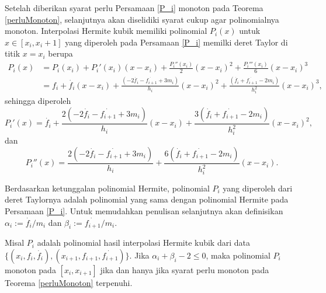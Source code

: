 Setelah diberikan syarat perlu Persamaan \eqref{P_i} monoton pada Teorema \ref{perluMonoton}, selanjutnya akan diselidiki syarat cukup agar polinomialnya monoton. Interpolasi Hermite kubik memiliki polinomial $P_i(x)$ untuk $x \in [x_i,x_i+1]$ yang diperoleh pada Persamaan \eqref{P_i} memilki deret Taylor di titik $x=x_i$ berupa
\begin{equation}\label{taylorHermite}
\begin{split}
    P_i(x) &= P_i(x_i) + P_i'(x_i)(x-x_i) + \frac{P_i''(x_i)}{2}(x-x_i)^2 + \frac{P_i'''(x_i)}{6}(x-x_i)^3 \\
    &= f_i + \dot{f_i}(x-x_i) + \frac{(-2\dot{f_i}-\dot{f_{i+1}}+3m_i)}{h_i}(x-x_i)^2 + \frac{(\dot{f_i}+\dot{f_{i+1}}-2m_i)}{h_i^2}(x-x_i)^3,
\end{split}
\end{equation}
sehingga diperoleh
\begin{equation}\label{taylorHermite2}
    P_i'(x) = \dot{f_i} + \frac{2(-2\dot{f_i}-\dot{f_{i+1}}+3m_i)}{h_i}(x-x_i) + \frac{3(\dot{f_i}+\dot{f_{i+1}}-2m_i)}{h_i^2}(x-x_i)^2,
\end{equation}
dan
\begin{equation}
    P_i''(x) = \frac{2(-2\dot{f_i}-\dot{f_{i+1}}+3m_i)}{h_i} + \frac{6(\dot{f_i}+\dot{f_{i+1}}-2m_i)}{h_i^2}(x-x_i).
\end{equation}

Berdasarkan ketunggalan polinomial Hermite, polinomial $P_i$ yang diperoleh dari deret Taylornya adalah polinomial yang sama dengan polinomial Hermite pada Persamaan \eqref{P_i}. Untuk memudahkan penulisan selanjutnya akan definisikan \mbox{$\alpha_i := \dot{f_i}/m_i$} dan $\beta_i := \dot{f_{i+1}}/m_i$.
\begin{lemma}\label{lema1}
     Misal $P_i$ adalah polinomial hasil interpolasi Hermite kubik dari data $\{(x_i,f_i,\dot{f_i}),(x_{i+1},f_{i+1},\dot{f_{i+1}})\}$. Jika $\alpha_i + \beta_i - 2 \leq 0$, maka polinomial $P_i$ monoton pada $[x_i,x_{i+1}]$ jika dan hanya jika syarat perlu monoton pada Teorema \ref{perluMonoton} terpenuhi.
\end{lemma}

